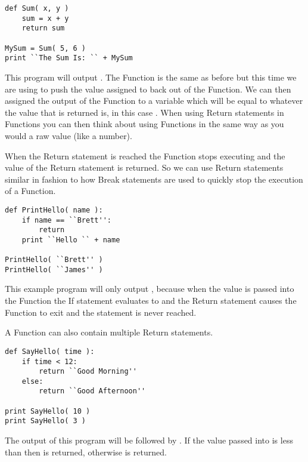 \begin{lstlisting}[caption={Return Example}]
def Sum( x, y )
    sum = x + y
    return sum

MySum = Sum( 5, 6 )
print ``The Sum Is: `` + MySum
\end{lstlisting}

This program will output .
The Function is the same as before but this time we are using  to push the value assigned to  back out of the Function.
We can then assigned the output of the Function  to a variable  which will be equal to whatever the value that is returned is,
in this case .
When using Return statements in Functions you can then think about using Functions in the same way as you would a raw value (like a number).
\par

When the Return statement is reached the Function stops executing and the value of the Return statement is returned.
So we can use Return statements similar in fashion to how Break statements are used to quickly stop the execution of a Function.

\begin{lstlisting}[caption={Return to Stop Function}]
def PrintHello( name ):
    if name == ``Brett'':
        return
    print ``Hello `` + name

PrintHello( ``Brett'' )
PrintHello( ``James'' )
\end{lstlisting}

This example program will only output , because when the value  is passed into the Function
the If statement evaluates to  and the Return statement causes the Function to exit and the  statement is
never reached.
\par

A Function can also contain multiple Return statements.

\begin{lstlisting}[caption={Multiple Return Statements}]
def SayHello( time ):
    if time < 12:
        return ``Good Morning''
    else:
        return ``Good Afternoon''

print SayHello( 10 )
print SayHello( 3 )
\end{lstlisting}

The output of this program will be  followed by .
If the value passed into  is less than  then  is returned, otherwise 
is returned.
\par

